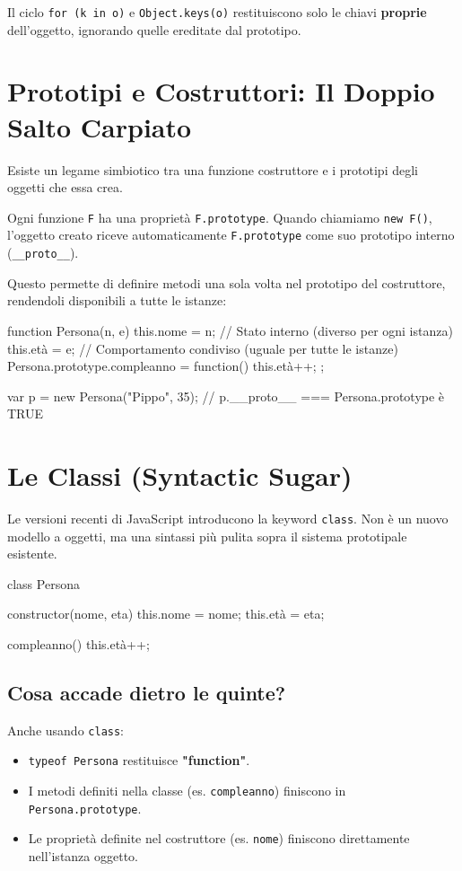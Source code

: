 \begin{warning}[Enumerabilità]
Il ciclo \texttt{for (k in o)} e \texttt{Object.keys(o)} restituiscono solo le chiavi \textbf{proprie} dell'oggetto, ignorando quelle ereditate dal prototipo.
\end{warning}

\section{Prototipi e Costruttori: Il Doppio Salto Carpiato}
Esiste un legame simbiotico tra una funzione costruttore e i prototipi degli oggetti che essa crea.
\begin{concept}
Ogni funzione \texttt{F} ha una proprietà \texttt{F.prototype}. Quando chiamiamo \texttt{new F()}, l'oggetto creato riceve automaticamente \texttt{F.prototype} come suo prototipo interno (\texttt{\_\_proto\_\_}).
\end{concept}

Questo permette di definire metodi una sola volta nel prototipo del costruttore, rendendoli disponibili a tutte le istanze:
\begin{jsbox}
function Persona(n, e) {
    this.nome = n; // Stato interno (diverso per ogni istanza)
    this.età = e;
}
// Comportamento condiviso (uguale per tutte le istanze)
Persona.prototype.compleanno = function() { this.età++; };

var p = new Persona("Pippo", 35);
// p.__proto__ === Persona.prototype è TRUE
\end{jsbox}

\section{Le Classi (Syntactic Sugar)}
Le versioni recenti di JavaScript introducono la keyword \texttt{class}. Non è un nuovo modello a oggetti, ma una sintassi più pulita sopra il sistema prototipale esistente.

\begin{jsbox}
class Persona {
    constructor(nome, eta) {
        this.nome = nome;
        this.età = eta;
    }

    compleanno() {
        this.età++;
    }
}
\end{jsbox}

\subsection{Cosa accade dietro le quinte?}
Anche usando \texttt{class}:
\begin{itemize}
    \item \texttt{typeof Persona} restituisce \textbf{"function"}.
    \item I metodi definiti nella classe (es. \texttt{compleanno}) finiscono in \texttt{Persona.prototype}.
    \item Le proprietà definite nel costruttore (es. \texttt{nome}) finiscono direttamente nell'istanza oggetto.
\end{itemize}

